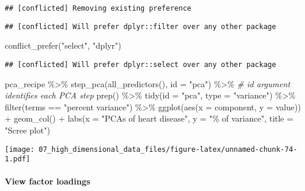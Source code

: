 \documentclass[
]{book}
\newenvironment{Shaded}{\begin{snugshade}}{\end{snugshade}}
\newcommand{\AttributeTok}[1]{\textcolor[rgb]{0.77,0.63,0.00}{#1}}
\newcommand{\CommentTok}[1]{\textcolor[rgb]{0.56,0.35,0.01}{\textit{#1}}}
\newcommand{\FunctionTok}[1]{\textcolor[rgb]{0.00,0.00,0.00}{#1}}
\newcommand{\NormalTok}[1]{#1}
\newcommand{\SpecialCharTok}[1]{\textcolor[rgb]{0.00,0.00,0.00}{#1}}
\newcommand{\StringTok}[1]{\textcolor[rgb]{0.31,0.60,0.02}{#1}}
\begin{document}
\begin{verbatim}
## [conflicted] Removing existing preference
\end{verbatim}

\begin{verbatim}
## [conflicted] Will prefer dplyr::filter over any other package
\end{verbatim}

\begin{Shaded}
\begin{Highlighting}[]
\FunctionTok{conflict\_prefer}\NormalTok{(}\StringTok{"select"}\NormalTok{, }\StringTok{"dplyr"}\NormalTok{) }
\end{Highlighting}
\end{Shaded}

\begin{verbatim}
## [conflicted] Will prefer dplyr::select over any other package
\end{verbatim}

\begin{Shaded}
\begin{Highlighting}[]
\NormalTok{pca\_recipe }\SpecialCharTok{\%\textgreater{}\%}
  \FunctionTok{step\_pca}\NormalTok{(}\FunctionTok{all\_predictors}\NormalTok{(), }
           \AttributeTok{id =} \StringTok{"pca"}\NormalTok{) }\SpecialCharTok{\%\textgreater{}\%} \CommentTok{\# id argument identifies each PCA step }
  \FunctionTok{prep}\NormalTok{() }\SpecialCharTok{\%\textgreater{}\%}
  \FunctionTok{tidy}\NormalTok{(}\AttributeTok{id =} \StringTok{"pca"}\NormalTok{, }\AttributeTok{type =} \StringTok{"variance"}\NormalTok{) }\SpecialCharTok{\%\textgreater{}\%}
  \FunctionTok{filter}\NormalTok{(terms }\SpecialCharTok{==} \StringTok{"percent variance"}\NormalTok{) }\SpecialCharTok{\%\textgreater{}\%} 
  \FunctionTok{ggplot}\NormalTok{(}\FunctionTok{aes}\NormalTok{(}\AttributeTok{x =}\NormalTok{ component, }\AttributeTok{y =}\NormalTok{ value)) }\SpecialCharTok{+}
    \FunctionTok{geom\_col}\NormalTok{() }\SpecialCharTok{+}
    \FunctionTok{labs}\NormalTok{(}\AttributeTok{x =} \StringTok{"PCAs of heart disease"}\NormalTok{,}
         \AttributeTok{y =} \StringTok{"\% of variance"}\NormalTok{,}
         \AttributeTok{title =} \StringTok{"Scree plot"}\NormalTok{)}
\end{Highlighting}
\end{Shaded}

\texttt{[image: 07\_high\_dimensional\_data\_files/figure-latex/unnamed-chunk-74-1.pdf]}

\hypertarget{view-factor-loadings}{%
\paragraph{View factor loadings}\label{view-factor-loadings}}
\end{document}

